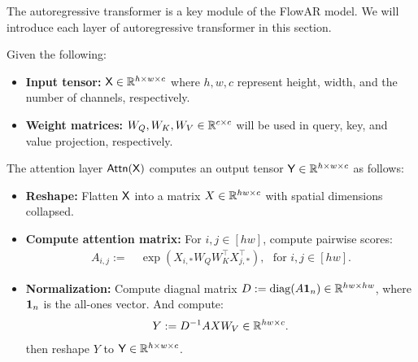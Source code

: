 The autoregressive transformer is a key module of the FlowAR model. We will introduce each layer of autoregressive transformer in this section.
\begin{definition}\label{def:attn_layer}
Given the following:
\begin{itemize}
    \item {\bf Input tensor:} $\mathsf{X} \in \mathbb{R}^{h \times w \times c}$ where $h,w,c$ represent height, width, and the number of channels, respectively.
    \item {\bf Weight matrices:} $W_Q,W_K,W_V \in \mathbb{R}^{c \times c}$ will be used in query, key, and value projection, respectively.
\end{itemize}
The attention layer $\mathsf{Attn}(\mathsf{X})$ computes an output tensor $\mathsf{Y} \in \mathbb{R}^{h \times w \times c}$ as follows:
\begin{itemize}
    \item {\bf Reshape:} Flatten $\mathsf{X}$ into a matrix $X \in \mathbb{R}^{hw \times c}$ with spatial dimensions collapsed.
    \item {\bf Compute attention matrix:} For $i,j \in [hw]$, compute pairwise scores:
    \begin{align*}
        A_{i,j} := & ~\exp(  X_{i,*}   W_Q   W_K^\top   X_{j,*}^\top), \text{~~for~} i, j \in [hw].
    \end{align*}
    \item {\bf Normalization:} Compute diagnal matrix $D:=\operatorname{diag}(A {\bf 1}_n) \in \mathbb{R}^{hw \times hw}$, where ${\bf 1}_n$ is the all-ones vector. And compute:
    \begin{align*}
         Y := D^{-1}AXW_V \in \mathbb{R}^{hw \times c}.
    \end{align*}
    then reshape $Y$ to $\mathsf{Y} \in \mathbb{R}^{h \times w \times c}$.
\end{itemize}
\end{definition}


